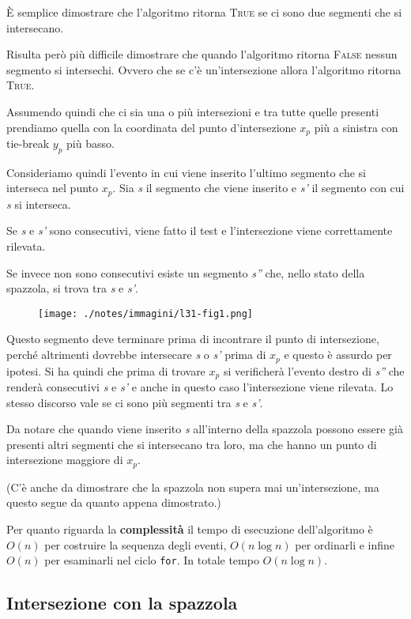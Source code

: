 È semplice dimostrare che l'algoritmo ritorna \textsc{True} se ci sono due segmenti che si intersecano.

Risulta però più difficile dimostrare che quando l'algoritmo ritorna \textsc{False} nessun segmento si intersechi. 
Ovvero che se c'è un'intersezione allora l'algoritmo ritorna \textsc{True}.

Assumendo quindi che ci sia una o più intersezioni e tra tutte quelle presenti prendiamo quella con la coordinata del punto d'intersezione $x_p$ più a sinistra con tie-break $y_p$ più basso.

Consideriamo quindi l'evento in cui viene inserito l'ultimo segmento che si interseca nel punto $x_p$. 
Sia \emph{s} il segmento che viene inserito e \emph{s'} il segmento con cui \emph{s} si interseca. 

Se \emph{s} e \emph{s'} sono consecutivi, viene fatto il test e l'intersezione viene correttamente rilevata. 

Se invece non sono consecutivi esiste un segmento \emph{s''} che, nello stato della spazzola, si trova tra \emph{s} e \emph{s'}. 

\begin{figure}[htbp]
	\centering
	\texttt{[image: ./notes/immagini/l31-fig1.png]}
\end{figure}

Questo segmento deve terminare prima di incontrare il punto di intersezione, perché altrimenti dovrebbe intersecare \emph{s} o \emph{s'} prima di $x_p$ e questo è assurdo per ipotesi. 
Si ha quindi che prima di trovare $x_p$ si verificherà l'evento destro di \emph{s''} che renderà consecutivi \emph{s} e \emph{s'} e anche in questo caso l'intersezione viene rilevata. 
Lo stesso discorso vale se ci sono più segmenti tra \emph{s} e \emph{s'}.

Da notare che quando viene inserito \emph{s} all'interno della spazzola possono essere già presenti altri segmenti che si intersecano tra loro, ma che hanno un punto di intersezione maggiore di $x_p$.

(C'è anche da dimostrare che la spazzola non supera mai un'intersezione, ma questo segue da quanto appena dimostrato.)

Per quanto riguarda la \textbf{complessità} il tempo di esecuzione dell'algoritmo è $O(n)$ per costruire la sequenza degli eventi, $O(n \log n)$ per ordinarli e infine $O(n)$ per esaminarli nel ciclo \texttt{for}. 
In totale tempo $O(n \log n)$.

\subsection{Intersezione con la spazzola}

